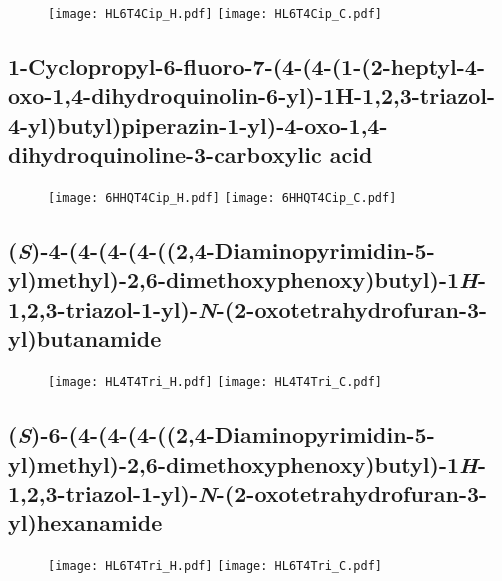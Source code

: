 \begin{figure}[H]
	\centering
		\texttt{[image: HL6T4Cip\_H.pdf]}
		\texttt{[image: HL6T4Cip\_C.pdf]}
\end{figure}

\subsection{1-Cyclopropyl-6-fluoro-7-(4-(4-(1-(2-heptyl-4-oxo-1,4-dihydroquinolin-6-yl)-1H-1,2,3-triazol-4-yl)butyl)piperazin-1-yl)-4-oxo-1,4-dihydroquinoline-3-carboxylic acid }

\begin{figure}[H]
	\centering
		\texttt{[image: 6HHQT4Cip\_H.pdf]}
		\texttt{[image: 6HHQT4Cip\_C.pdf]}
\end{figure}

\subsection{(\textit{S})-4-(4-(4-(4-((2,4-Diaminopyrimidin-5-yl)methyl)-2,6-dimethoxyphenoxy)butyl)-1\textit{H}-1,2,3-triazol-1-yl)-\textit{N}-(2-oxotetrahydrofuran-3-yl)butanamide }

\begin{figure}[H]
	\centering
		\texttt{[image: HL4T4Tri\_H.pdf]}
		\texttt{[image: HL4T4Tri\_C.pdf]}
\end{figure}

\subsection{(\textit{S})-6-(4-(4-(4-((2,4-Diaminopyrimidin-5-yl)methyl)-2,6-dimethoxyphenoxy)butyl)-1\textit{H}-1,2,3-triazol-1-yl)-\textit{N}-(2-oxotetrahydrofuran-3-yl)hexanamide }

\begin{figure}[H]
	\centering
		\texttt{[image: HL6T4Tri\_H.pdf]}
		\texttt{[image: HL6T4Tri\_C.pdf]}
\end{figure}

